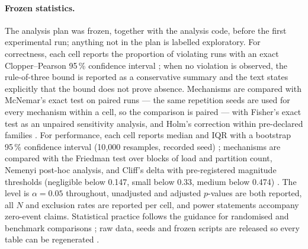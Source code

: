 \paragraph{Frozen statistics.}
The analysis plan was frozen, together with the analysis code, before the first experimental run;
anything not in the plan is labelled exploratory. For correctness, each cell reports the
proportion of violating runs with an exact Clopper--Pearson 95\,\% confidence interval
\cite{brown2001,jsta2014}; when no violation is observed, the rule-of-three bound is reported as a
conservative summary \cite{rule3} and the text states explicitly that the bound does not prove
absence. Mechanisms are compared with McNemar's exact test on paired runs --- the same repetition
seeds are used for every mechanism within a cell, so the comparison is paired \cite{mcnemar1947}
--- with Fisher's exact test as an unpaired sensitivity analysis, and Holm's correction within
pre-declared families \cite{holland1987}. For performance, each cell reports median and IQR with a
bootstrap 95\,\% confidence interval (10{,}000 resamples, recorded seed) \cite{efron1979};
mechanisms are compared with the Friedman test over blocks of load and partition count, Nemenyi
post-hoc analysis, and Cliff's delta with pre-registered magnitude thresholds (negligible below
0.147, small below 0.33, medium below 0.474) \cite{demsar2006,cliff1993}. The level is
$\alpha=0.05$ throughout, unadjusted and adjusted $p$-values are both reported, all $N$ and
exclusion rates are reported per cell, and power statements accompany zero-event claims.
Statistical practice follows the guidance for randomised and benchmark comparisons
\cite{arcuri2011,arcuri2012}; raw data, seeds and frozen scripts are released so every table can
be regenerated \cite{collberg2016}.

